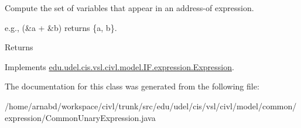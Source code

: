 Compute the set of variables that appear in an address-\/of expression. 

e.\+g., {\ttfamily (\&a + \&b)} returns {\ttfamily \{a, b\}}.

\begin{DoxyReturn}{Returns}

\end{DoxyReturn}


Implements \hyperlink{interfaceedu_1_1udel_1_1cis_1_1vsl_1_1civl_1_1model_1_1IF_1_1expression_1_1Expression_ac2ad0236534bec54b91ee78ff658cbe0}{edu.\+udel.\+cis.\+vsl.\+civl.\+model.\+I\+F.\+expression.\+Expression}.



The documentation for this class was generated from the following file\+:\begin{DoxyCompactItemize}
\item 
/home/arnabd/workspace/civl/trunk/src/edu/udel/cis/vsl/civl/model/common/expression/Common\+Unary\+Expression.\+java\end{DoxyCompactItemize}
